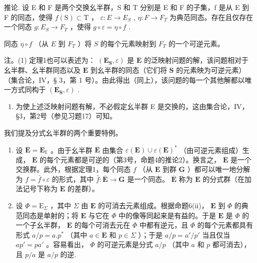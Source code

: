推论. 设 E 和 F 是两个交换幺半群，S 和 T 分别是 E 和 F 的子集，f 是从 E 到 F 的同态，使得 \(f(\mathrm{S}) \subset \mathrm{T}\) ， \(\varepsilon: E \to E_{S}\) , \(\eta: F \to F_{T}\) 为典范同态。存在且仅存在一个同态 \(g: E_{S} \to F_{T}\) ，使得 \(g \circ \varepsilon = \eta \circ f\) .

同态 \(\eta \circ f\) （从 \(E\) 到 \(F_{T}\) ）将 \(S\) 的每个元素映射到 \(F_{T}\) 的一个可逆元素。

注。(1) 定理1也可以表述为： \((\mathbf{E}_{\mathbf{S}},\varepsilon)\) 是 \(\mathbf{E}\) 的泛映射问题的解，该问题相对于幺半群、幺半群同态以及 \(\mathbf{E}\) 到幺半群的同态（它们将 \(\mathbf{S}\) 的元素映为可逆元素）（集合论，IV，§ 3，第 1 号）。由此得出（同上），该问题的每一个其他解都以唯一方式同构于 \((\mathbf{E}_{\mathbf{S}},\varepsilon)\) .

\begin{enumerate}
\def\labelenumi{(\arabic{enumi})}
\setcounter{enumi}{1}
\tightlist
\item
  为使上述泛映射问题有解，不必假定幺半群 E 是交换的，这由集合论，IV，§3，第2号（参见习题17）可知。
\end{enumerate}

我们提及分式幺半群的两个重要特例。

\begin{enumerate}
\def\labelenumi{(\alph{enumi})}
\item
  设 \(\overline{\mathbf{E}} = \mathbf{E}_{\mathbb{E}}\) 。由于幺半群 \(\overline{\mathbf{E}}\) 由集合 \(\varepsilon(\mathbf{E}) \cup \varepsilon(\mathbf{E})^*\) （由可逆元素组成）生成， \(\overline{\mathbf{E}}\) 的每个元素都是可逆的（第3号，命题4的推论2）。换言之， \(\overline{\mathbf{E}}\) 是一个交换群。此外，根据定理1，每个同态 \(f\) （从 \(\mathbf{E}\) 到群 \(\mathbf{G}\) ）都可以唯一地分解为 \(f = \bar{f} \circ \varepsilon\) 的形式，其中 \(\bar{f}: \overline{\mathbf{E}} \to \mathbf{G}\) 是一个同态。 \(\overline{\mathbf{E}}\) 称为 \(\mathbf{E}\) 的分式群（在加法记号下称为 \(\mathbf{E}\) 的差群）。
\item
  设 \(\Phi = \mathrm{E}_{\Sigma}\) ，其中 \(\Sigma\) 由 \(\mathbf{E}\) 的可消去元素组成。根据命题6(ii)， \(\mathbf{E}\) 到 \(\Phi\) 的典范同态是单射的；将 \(\mathbf{E}\) 与它在 \(\Phi\) 中的像等同起来是有益的。于是 \(\mathbf{E}\) 是 \(\Phi\) 的一个子幺半群， \(\mathbf{E}\) 的每个可消去元在 \(\Phi\) 中都有逆元，且 \(\Phi\) 的每个元素都具有形式 \(a/p = a.p^{*}\) （其中 \(a \in \mathbf{E}\) 和 \(p \in \Sigma\) ）；于是 \(a/p = a'/p'\) 当且仅当 \(ap' = pa'\) 。容易看出， \(\Phi\) 的可逆元素是分式 \(a/p\) （其中 \(a\) 和 \(p\) 都可消去），且 \(p/a\) 是 \(a/p\) 的逆.
\end{enumerate}

